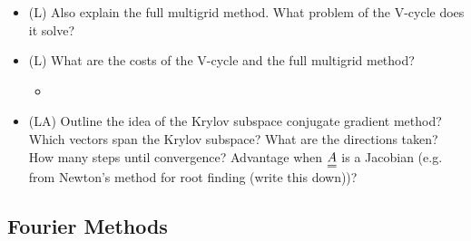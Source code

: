 \begin{itemize}
    \begin{itemize}
        \item {}
    \end{itemize}
    \answerboxM
    \item (L) Also explain the full multigrid method. What problem
    of the V-cycle does it solve?
    \answerboxM
    \item (L) What are the costs of the V-cycle and the full multigrid method?
    \begin{itemize}
        \item {}
    \end{itemize}
    \answerboxM
    \item (LA) Outline the idea of the Krylov subspace conjugate gradient method? Which vectors span the Krylov subspace?
    What are the directions taken? How many steps until convergence? Advantage when $\mat{A}$ is a Jacobian (e.g. from 
    Newton's method for root finding (write this down))?
    \answerboxL
\end{itemize}

\subsection*{Fourier Methods}

